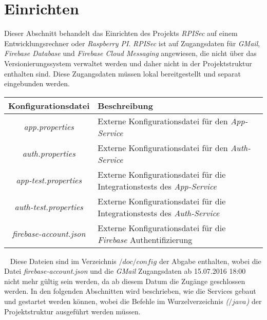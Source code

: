 \documentclass[]{article}
\begin{document}
\section{Einrichten}
Dieser Abschnitt behandelt das Einrichten des Projekts \emph{RPISec} auf einem Entwicklungsrechner oder \emph{Raspberry PI}. \emph{RPISec} ist auf Zugangsdaten für \emph{GMail}, \emph{Firebase Database} und \emph{Firebase Cloud Messaging} angewiesen, die nicht über das Versionierungssystem verwaltet werden und daher nicht in der Projektstruktur enthalten sind. Diese Zugangsdaten müssen lokal bereitgestellt und separat eingebunden werden.
{\renewcommand{\arraystretch}{2}%
\begin{center}
	\begin{tabular}{| c | l | p{7cm} |}
		\hline
		\textbf{Konfigurationsdatei} & \textbf{Beschreibung}  \\ \hline
		\textit{app.properties} & Externe Konfigurationsdatei für den \emph{App-Service} \\ \hline
		\textit{auth.properties} & Externe Konfigurationsdatei für den \emph{Auth-Service} \\ \hline
		\textit{app-test.properties} & Externe Konfigurationsdatei für die Integrationstests des \emph{App-Service} \\ \hline
		\textit{auth-test.properties} & Externe Konfigurationsdatei für die Integrationstests des \emph{Auth-Service} \\ \hline
		\textit{firebase-account.json} & Externe Konfigurationsdatei für die \emph{Firebase} Authentifizierung \\ \hline
	\end{tabular}
\end{center}
\ \newline
Diese Dateien sind im Verzeichnis \emph{$/doc/config$} der Abgabe enthalten, wobei die Datei \emph{firebase-account.json} und die \emph{GMail} Zugangsdaten ab 15.07.2016 18:00 nicht mehr gültig sein werden, da ab diesem Datum die Zugänge geschlossen werden.
\newline
\newline
In den folgenden Abschnitten wird beschrieben, wie die Services gebaut und gestartet werden können, wobei die Befehle im Wurzelverzeichnis \emph{($/java$)} der Projektstruktur ausgeführt werden müssen.

}
\end{document}
